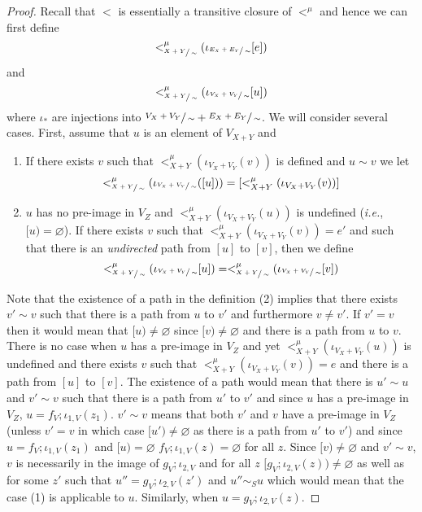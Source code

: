 \begin{proof}
Recall that $<$ is essentially a transitive closure of $<^{\mu}$ and hence we can first define 
    \[<_{\sfrac{X+Y}{\sim}}^{\mu}(\iota_{\sfrac{E_{X} + E_{Y}}{\sim}}[e])
    \] and 
    \[
        <_{\sfrac{X+Y}{\sim}}^{\mu}(\iota_{\sfrac{V_{X} + V_{Y}}{\sim}}[u])
    \] where $\iota_*$ are injections into $\sfrac{V_{X} + V_{Y}}{\sim} + \sfrac{E_{X} + E_{Y}}{\sim}$.
    We will consider several cases.
    First, assume that $u$ is an element of $V_{X+Y}$ and
    \begin{enumerate}
        \item If there exists $v$ such that $<_{X+Y}^{\mu}(\iota_{V_{X} + V_{Y}}(v))$ is defined and $u \sim v$
              we let
              \[
                <_{\sfrac{X+Y}{\sim}}^{\mu}(\iota_{\sfrac{V_{X} + V_{Y}}{\sim}}([u])) = [<_{X+Y}^{\mu}(\iota_{V_{X} + V_{Y}}(v))]
              \]
        \item \label{def:child_respects_connectivity} $u$ has no pre-image in $V_{Z}$ and $<_{X+Y}^{\mu}(\iota_{V_{X} + V_{Y}}(u))$ is undefined (\textit{i.e.}, $[u) = \varnothing$).
              If there exists $v$ such that $<_{X+Y}^{\mu}(\iota_{V_{X} + V_{Y}}(v)) = e'$ and such that there is an \textit{undirected} path from $[u]$ to $[v]$, then we define
              \[ 
                <_{\sfrac{X+Y}{\sim}}^{\mu}(\iota_{\sfrac{V_{X} + V_{Y}}{\sim}}[u]) = <_{\sfrac{X+Y}{\sim}}^{\mu}(\iota_{\sfrac{V_{X} + V_{Y}}{\sim}}[v])
              \]
    \end{enumerate}
    Note that the existence of a path in the definition (2) implies that there exists $v' \sim v$ such that there is a path from $u$ to $v'$ and furthermore $v \not = v'$.
    If $v' = v$ then it would mean that $[u) \not = \varnothing$ since $[v) \not = \varnothing$ and there is a path from $u$ to $v$.
    There is no case when $u$ has a pre-image in $V_{Z}$ and yet $<_{X+Y}^{\mu}(\iota_{V_{X} + V_{Y}}(u))$ is undefined and there exists $v$ such that $<_{X+Y}^{\mu}(\iota_{V_{X} + V_{Y}}(v)) = e$ and there is a path from $[u]$ to $[v]$.
    The existence of a path would mean that there is $u' \sim u$ and $v' \sim v$ such that there is a path from $u'$ to $v'$ and since $u$ has a pre-image in $V_{Z}$, $u = f_{V};\iota_{1,V}(z_1)$.
    $v' \sim v$ means that both $v'$ and $v$ have a pre-image in $V_{Z}$ (unless $v' = v$ in which case $[u') \not = \varnothing$ as there is a path from $u'$ to $v'$) and since $u = f_{V};\iota_{1,V}(z_1)$ and $[u) = \varnothing$ $f_{V};\iota_{1,V}(z) = \varnothing$ for all $z$.
    Since $[v) \not = \varnothing$ and $v' \sim v$, $v$ is necessarily in the image of $g_{V};\iota_{2,V}$ and for all $z$ $[g_{V};\iota_{2,V}(z)) \not = \varnothing$ as well as for some $z'$ such that $u'' = g_{V};\iota_{2,V}(z')$ and $u'' \sim_{S} u$ which would mean that the case (1) is applicable to $u$.
    Similarly, when $u = g_{V};\iota_{2,V}(z)$.
    

\end{proof}
